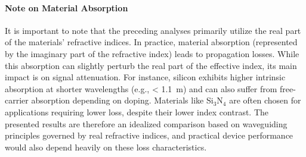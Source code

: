 \documentclass[10pt, a4paper]{article}
\begin{document}
\paragraph{Note on Material Absorption}
It is important to note that the preceding analyses primarily utilize the real part of the materials' refractive indices. In practice, material absorption (represented by the imaginary part of the refractive index) leads to propagation losses. While this absorption can slightly perturb the real part of the effective index, its main impact is on signal attenuation. For instance, silicon exhibits higher intrinsic absorption at shorter wavelengths (e.g., < 1.1~{\textmu}m) and can also suffer from free-carrier absorption depending on doping. Materials like Si$_3$N$_4$ are often chosen for applications requiring lower loss, despite their lower index contrast. The presented results are therefore an idealized comparison based on waveguiding principles governed by real refractive indices, and practical device performance would also depend heavily on these loss characteristics.
\end{document}
